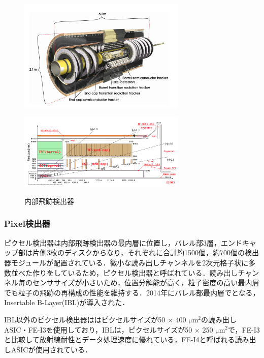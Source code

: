 \begin{figure}[h]
  \centering
  \begin{minipage}[b]{0.45\linewidth}
    \centering
    \includegraphics[width=8cm]{./figure/ID.png}
    \label{fig:ID}
  \end{minipage}
  \begin{minipage}[b]{0.45\linewidth}
    \centering
    \includegraphics[width=8cm]{./figure/pixelview.png}
    \label{fig:IDview}
  \end{minipage}
  \caption{内部飛跡検出器\cite{Collaboration_2008}}
\end{figure}


\subsubsection*{Pixel検出器}
ピクセル検出器は内部飛跡検出器の最内層に位置し，バレル部3層，エンドキャップ部は片側3枚のディスクからなり，それぞれに合計約1500個，約700個の検出器モジュールが配置されている．微小な読み出しチャンネルを2次元格子状に多数並べた作りをしているため，ピクセル検出器と呼ばれている．読み出しチャンネル毎のセンササイズが小さいため，位置分解能が高く，粒子密度の高い最内層でも粒子の飛跡の再構成の性能を維持する．2014年にバレル部最内層でとなる，Insertable B-Layer(IBL)が導入された．\par
IBL以外のピクセル検出器ははピクセルサイズが50 $\times$ 400 $\mathrm{\mu m^2}$の読み出しASIC・FE-I3を使用しており，IBLは，ピクセルサイズが50 $\times$ 250 $\mathrm{\mu m^2}$で，FE-I3と比較して放射線耐性とデータ処理速度に優れている，FE-I4と呼ばれる読み出しASICが使用されている．\par

